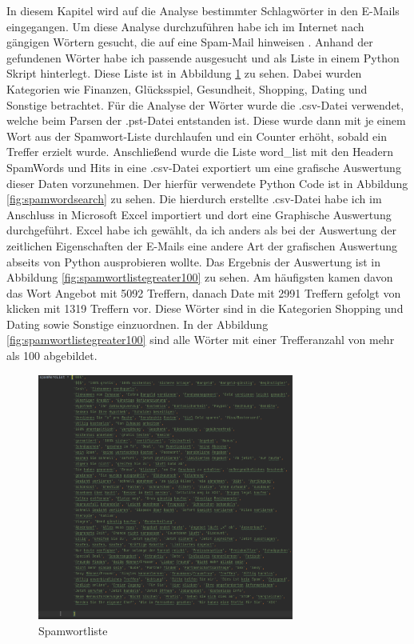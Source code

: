 In diesem Kapitel wird auf die Analyse bestimmter Schlagwörter in den E-Mails eingegangen. Um diese Analyse durchzuführen habe ich im Internet nach gängigen Wörtern gesucht, die auf eine Spam-Mail hinweisen \cite{Heise.07.06.2021}. Anhand der gefundenen Wörter habe ich passende ausgesucht und als Liste in einem Python Skript hinterlegt. Diese Liste ist in Abbildung \ref{fig:spamwortliste} zu sehen. Dabei wurden Kategorien wie Finanzen, Glücksspiel, Gesundheit, Shopping, Dating und Sonstige betrachtet. Für die Analyse der Wörter wurde die .csv-Datei verwendet, welche beim Parsen der .pst-Datei entstanden ist. Diese wurde dann mit je einem Wort aus der Spamwort-Liste durchlaufen und ein Counter erhöht, sobald ein Treffer erzielt wurde. Anschließend wurde die Liste \glqq{}word\_list\grqq{} mit den Headern \glqq{}SpamWords\grqq{} und \glqq{}Hits\grqq{} in eine .csv-Datei exportiert um eine grafische Auswertung dieser Daten vorzunehmen. Der hierfür verwendete Python Code ist in Abbildung \ref{fig:spamwordsearch} zu sehen. Die hierdurch erstellte .csv-Datei habe ich im Anschluss in Microsoft Excel importiert und dort eine Graphische Auswertung durchgeführt. Excel habe ich gewählt, da ich anders als bei der Auswertung der zeitlichen Eigenschaften der E-Mails eine andere Art der grafischen Auswertung abseits von Python ausprobieren wollte. Das Ergebnis der Auswertung ist in Abbildung \ref{fig:spamwortlistegreater100} zu sehen. Am häufigsten kamen davon das Wort \glqq{}Angebot\grqq{} mit 5092 Treffern, danach \glqq{}Date\grqq{} mit 2991 Treffern gefolgt von \glqq{}klicken\grqq{} mit 1319 Treffern vor. Diese Wörter sind in die Kategorien Shopping und Dating sowie Sonstige einzuordnen. In der Abbildung \ref{fig:spamwortlistegreater100} sind alle Wörter mit einer Trefferanzahl von mehr als 100 abgebildet.

\begin{figure}
    \centering
    \includegraphics[width=0.75\textwidth]{images/Spamwortliste.PNG}
    \caption{Spamwortliste} 
    \label{fig:spamwortliste}
\end{figure}


